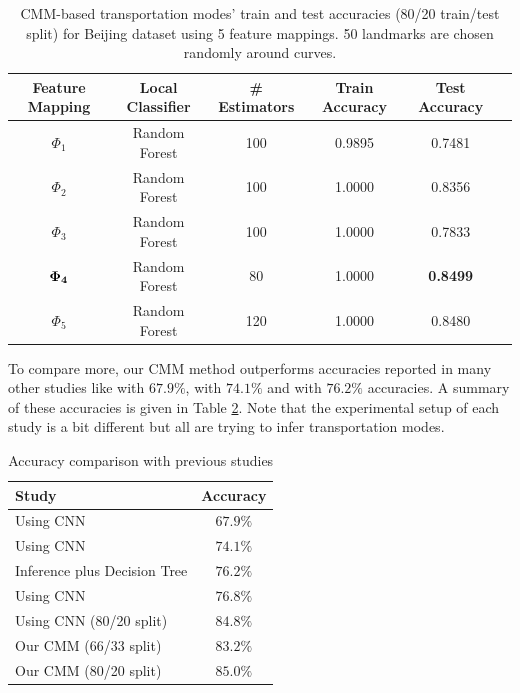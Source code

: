 \documentclass[11pt]{myclass}
\begin{document}
\begin{table}[htbp]
\centering
\begin{tabular}{|c|c|c|c|c|c|}
\hline
       {\bf Feature Mapping} &  {\bf Local Classifier} &  {\bf \# Estimators}  &   {\bf Train Accuracy} &  {\bf Test Accuracy}   \\
\hline 
$\Phi_1$  & Random Forest  &  100 &   0.9895 &    0.7481  \\ 
\hline 
$\Phi_2$  & Random Forest  &  100 &   1.0000 &    0.8356  \\ 
\hline 
$\Phi_3$	&  Random Forest  & 100 &   1.0000 &    0.7833  \\ 
\hline 
$\bf \Phi_4$  & Random Forest  &  80 &   1.0000 &    {\bf 0.8499}  \\ 
\hline 
$\Phi_5$  &  Random Forest  & 120 &   1.0000 &    0.8480  \\ 
\hline 
\end{tabular}
\caption{CMM-based transportation modes' train and test accuracies (80/20 train/test split) for Beijing dataset using 5 feature mappings. 50 landmarks are chosen randomly around curves.}
\label{table-CMM-RF}
\normalsize
\end{table}

To compare more, our CMM method outperforms accuracies reported in many other studies like \cite{ETNK2016} with $67.9\%$, \cite{WLJL2017} with $74.1\%$ and \cite{ZLCXM2008} with $76.2\%$ accuracies. A summary of these accuracies is given in Table \ref{table-accuracy-summary}. Note that the experimental setup of each study is a bit different but all are trying to infer transportation modes. 

\begin{table}[htbp]
\centering
\begin{tabular}{|l|c|}
\hline
       {\bf Study} &  {\bf Accuracy}   \\
\hline 
Using CNN \cite{ETNK2016} & $67.9\%$   \\ 
Using CNN \cite{WLJL2017} & $74.1\%$  \\ 
Inference plus Decision Tree \cite{ZLCXM2008} & $76.2\%$  \\ 
Using CNN \cite{DCHR2020} &  $76.8\%$  \\ 
Using CNN (80/20 split) \cite{DH2018}  & $84.8\%$ \\
Our CMM (66/33 split)  &  $83.2\%$ \\ 
Our CMM (80/20 split)  &  $85.0\%$ \\ 
\hline
\end{tabular}
\caption{Accuracy comparison with previous studies}
\label{table-accuracy-summary}
\normalsize
\end{table}
\end{document}
